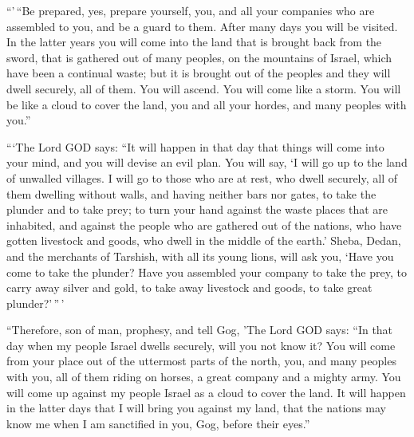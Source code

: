  ``'\,``Be prepared, yes, prepare yourself, you, and all
your companies who are assembled to you, and be a guard to them.
 After many days you will be visited. In the latter years
you will come into the land that is brought back from the sword, that is
gathered out of many peoples, on the mountains of Israel, which have
been a continual waste; but it is brought out of the peoples and they
will dwell securely, all of them.  You will ascend. You
will come like a storm. You will be like a cloud to cover the land, you
and all your hordes, and many peoples with you.''

 ```The Lord GOD says: ``It will happen in that day that
things will come into your mind, and you will devise an evil plan.
 You will say, `I will go up to the land of unwalled
villages. I will go to those who are at rest, who dwell securely, all of
them dwelling without walls, and having neither bars nor gates,
 to take the plunder and to take prey; to turn your hand
against the waste places that are inhabited, and against the people who
are gathered out of the nations, who have gotten livestock and goods,
who dwell in the middle of the earth.'  Sheba, Dedan, and
the merchants of Tarshish, with all its young lions, will ask you, `Have
you come to take the plunder? Have you assembled your company to take
the prey, to carry away silver and gold, to take away livestock and
goods, to take great plunder?'\,''\,'

 ``Therefore, son of man, prophesy, and tell Gog, 'The
Lord GOD says: ``In that day when my people Israel dwells securely, will
you not know it?  You will come from your place out of
the uttermost parts of the north, you, and many peoples with you, all of
them riding on horses, a great company and a mighty army.
 You will come up against my people Israel as a cloud to
cover the land. It will happen in the latter days that I will bring you
against my land, that the nations may know me when I am sanctified in
you, Gog, before their eyes.''


